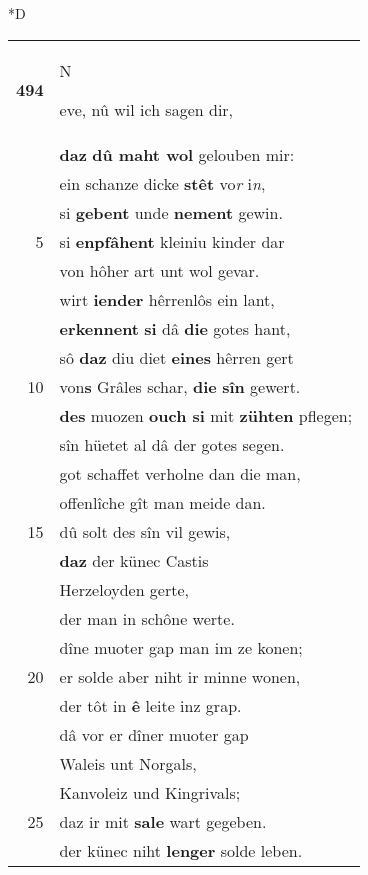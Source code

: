 \documentclass[8pt,a4paper,notitlepage]{article}
\begin{document}
\begin{table}[ht]
\begin{minipage}[t]{0.5\linewidth}
\small
\begin{center}*D
\end{center}
\begin{tabular}{rl}
\textbf{494} & \begin{large}N\end{large}eve, nû wil ich sagen dir,\\ 
 & \textbf{daz} \textbf{dû maht wol} gelouben mir:\\ 
 & ein schanze dicke \textbf{stêt} vo\textit{r} i\textit{n},\\ 
 & si \textbf{gebent} unde \textbf{nement} gewin.\\ 
5 & si \textbf{enpfâhent} kleiniu kinder dar\\ 
 & von hôher art unt wol gevar.\\ 
 & wirt \textbf{iender} hêrrenlôs ein lant,\\ 
 & \textbf{erkennent} \textbf{si} dâ \textbf{die} gotes hant,\\ 
 & sô \textbf{daz} diu diet \textbf{eines} hêrren gert\\ 
10 & von\textbf{s} Grâles schar, \textbf{die} \textbf{sîn} gewert.\\ 
 & \textbf{des} muozen \textbf{ouch si} mit \textbf{zühten} pflegen;\\ 
 & sîn hüetet al dâ der gotes segen.\\ 
 & got schaffet verholne dan die man,\\ 
 & offenlîche gît man meide dan.\\ 
15 & dû solt des sîn vil gewis,\\ 
 & \textbf{daz} der künec Castis\\ 
 & Herzeloyden gerte,\\ 
 & der man in schône werte.\\ 
 & dîne muoter gap man im ze konen;\\ 
20 & er solde aber niht ir minne wonen,\\ 
 & der tôt in \textbf{ê} leite inz grap.\\ 
 & dâ vor er dîner muoter gap\\ 
 & Waleis unt Norgals,\\ 
 & Kanvoleiz und Kingrivals;\\ 
25 & daz ir mit \textbf{sale} wart gegeben.\\ 
 & der künec niht \textbf{lenger} solde leben.\\ 

\end{tabular}
\end{minipage}
\end{table}
\end{document}
